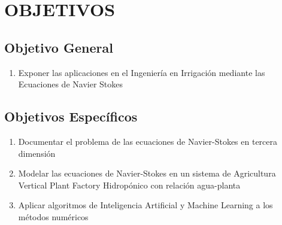 \chapter{OBJETIVOS}
\section{Objetivo General}
\begin{enumerate}
    \item Exponer las aplicaciones en el Ingeniería en Irrigación mediante las Ecuaciones de Navier Stokes
\end{enumerate}
\section{Objetivos Específicos}
\begin{enumerate}
        \item Documentar el problema de las ecuaciones de Navier-Stokes en tercera dimensión
        \item Modelar las ecuaciones de Navier-Stokes en un sistema de Agricultura Vertical Plant Factory Hidropónico con relación agua-planta
        \item Aplicar algoritmos de Inteligencia Artificial y Machine Learning a los métodos numéricos
\end{enumerate}